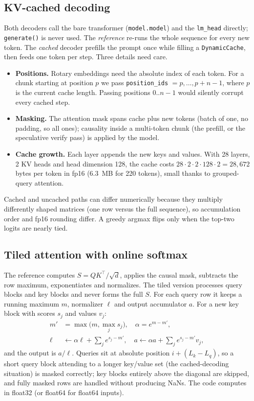 \documentclass[conference]{IEEEtran}
\begin{document}
\subsection{KV-cached decoding}
Both decoders call the bare transformer (\texttt{model.model}) and the \texttt{lm\_head} directly; \texttt{generate()} is never used. The \emph{reference} re-runs the whole sequence for every new token. The \emph{cached} decoder prefills the prompt once while filling a \texttt{DynamicCache}, then feeds one token per step. Three details need care.
\begin{itemize}
\item \textbf{Positions.} Rotary embeddings need the absolute index of each token. For a chunk starting at position $p$ we pass \texttt{position\_ids} $=p,\dots,p+n-1$, where $p$ is the current cache length. Passing positions $0..n-1$ would silently corrupt every cached step.
\item \textbf{Masking.} The attention mask spans cache plus new tokens (batch of one, no padding, so all ones); causality inside a multi-token chunk (the prefill, or the speculative verify pass) is applied by the model.
\item \textbf{Cache growth.} Each layer appends the new keys and values. With 28 layers, 2 KV heads and head dimension 128, the cache costs $28\cdot2\cdot2\cdot128\cdot2=28{,}672$ bytes per token in fp16 (6.3~MB for 220 tokens), small thanks to grouped-query attention.
\end{itemize}
Cached and uncached paths can differ numerically because they multiply differently shaped matrices (one row versus the full sequence), so accumulation order and fp16 rounding differ. A greedy argmax flips only when the top-two logits are nearly tied.

\subsection{Tiled attention with online softmax}
The reference computes $S=QK^\top/\sqrt d$, applies the causal mask, subtracts the row maximum, exponentiates and normalizes. The tiled version processes query blocks and key blocks and never forms the full $S$. For each query row it keeps a running maximum $m$, normalizer $\ell$ and output accumulator $a$. For a new key block with scores $s_j$ and values $v_j$:
\begin{align}
m' &= \max\bigl(m,\max_j s_j\bigr), \quad \alpha=e^{m-m'},\nonumber\\
\ell &\leftarrow \alpha\ell+\textstyle\sum_j e^{s_j-m'}, \quad
a \leftarrow \alpha a+\textstyle\sum_j e^{s_j-m'}v_j,
\end{align}
and the output is $a/\ell$. Queries sit at absolute position $i+(L_k-L_q)$, so a short query block attending to a longer key/value set (the cached-decoding situation) is masked correctly; key blocks entirely above the diagonal are skipped, and fully masked rows are handled without producing NaNs. The code computes in float32 (or float64 for float64 inputs).
\end{document}
